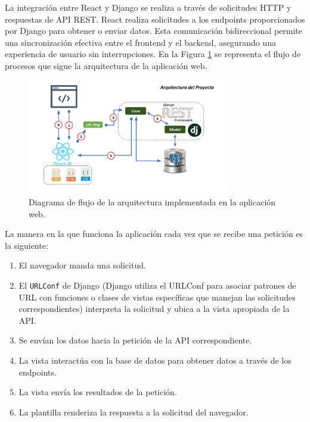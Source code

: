 La integración entre React y Django se realiza a través de solicitudes HTTP y respuestas de API REST. React realiza solicitudes a los endpoints proporcionados por Django para obtener o enviar datos. Esta comunicación bidireccional permite una sincronización efectiva entre el frontend y el backend, asegurando una experiencia de usuario sin interrupciones. En la Figura \ref{fig:arquitectura_app} se representa el flujo de procesos que sigue la arquitectura de la aplicación web.



\begin{figure}[H]
        \centering
        \includegraphics[width=0.8\textwidth]{images/arquitectura_app.jpg}
        \caption{Diagrama de flujo de la arquitectura implementada en la aplicación web.} \label{fig:arquitectura_app}
\end{figure}

La manera en la que funciona la aplicación cada vez que se recibe una petición es la siguiente:

\begin{enumerate}
  \item El navegador manda una solicitud.
  \item El \texttt{URLConf} de Django (Django utiliza el URLConf para asociar patrones de URL con funciones o clases de vistas específicas que manejan las solicitudes correspondientes) interpreta la solicitud y ubica a la vista apropiada de la API.
  \item Se envían los datos hacia la petición de la API correspondiente.
  \item La vista interactúa con la base de datos para obtener datos a través de los endpoints.
  \item La vista envía los resultados de la petición.
  \item La plantilla renderiza la respuesta a la solicitud del navegador.
\end{enumerate}

